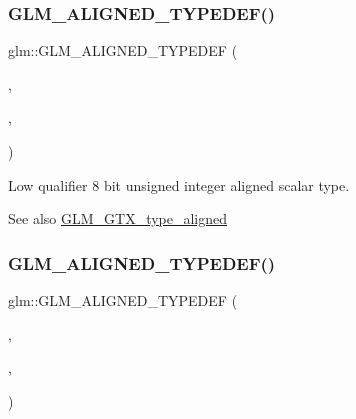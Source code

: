 \subsubsection{\texorpdfstring{G\+L\+M\+\_\+\+A\+L\+I\+G\+N\+E\+D\+\_\+\+T\+Y\+P\+E\+D\+E\+F()}{GLM\_ALIGNED\_TYPEDEF()}\hspace{0.1cm}{\footnotesize\ttfamily [73/209]}}
{\footnotesize\ttfamily glm\+::\+G\+L\+M\+\_\+\+A\+L\+I\+G\+N\+E\+D\+\_\+\+T\+Y\+P\+E\+D\+EF (\begin{DoxyParamCaption}\item[{\hyperlink{group__gtc__type__precision_ga0910ef24195d1b8b26e34d73148c0c45}{lowp\+\_\+uint8\+\_\+t}}]{,  }\item[{aligned\+\_\+lowp\+\_\+uint8\+\_\+t}]{,  }\item[{1}]{ }\end{DoxyParamCaption})}

Low qualifier 8 bit unsigned integer aligned scalar type. \begin{DoxySeeAlso}{See also}
\hyperlink{group__gtx__type__aligned}{G\+L\+M\+\_\+\+G\+T\+X\+\_\+type\+\_\+aligned} 
\end{DoxySeeAlso}
\mbox{\label{group__gtx__type__aligned_gaf2b58f5fb6d4ec8ce7b76221d3af43e1}} 
\subsubsection{\texorpdfstring{G\+L\+M\+\_\+\+A\+L\+I\+G\+N\+E\+D\+\_\+\+T\+Y\+P\+E\+D\+E\+F()}{GLM\_ALIGNED\_TYPEDEF()}\hspace{0.1cm}{\footnotesize\ttfamily [74/209]}}
{\footnotesize\ttfamily glm\+::\+G\+L\+M\+\_\+\+A\+L\+I\+G\+N\+E\+D\+\_\+\+T\+Y\+P\+E\+D\+EF (\begin{DoxyParamCaption}\item[{\hyperlink{group__gtc__type__precision_ga9a71176a4e5bc61951f9e9197d9c80e1}{lowp\+\_\+uint16\+\_\+t}}]{,  }\item[{aligned\+\_\+lowp\+\_\+uint16\+\_\+t}]{,  }\item[{2}]{ }\end{DoxyParamCaption})}

